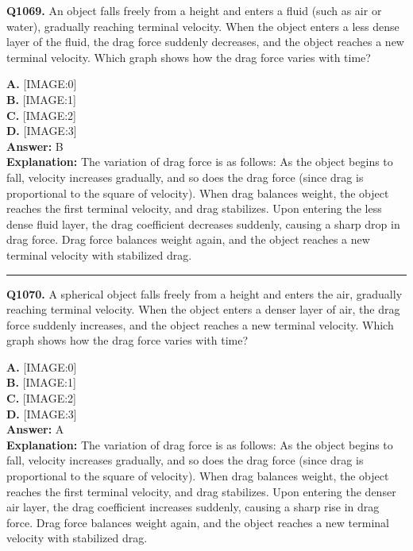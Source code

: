 \documentclass[12pt]{article}
\begin{document}
\noindent
\textbf{Q1069.} An object falls freely from a height and enters a fluid (such as air or water), gradually reaching terminal velocity. When the object enters a less dense layer of the fluid, the drag force suddenly decreases, and the object reaches a new terminal velocity. Which graph shows how the drag force varies with time?



\textbf{A.} [IMAGE:0] \\
\textbf{B.} [IMAGE:1] \\
\textbf{C.} [IMAGE:2] \\
\textbf{D.} [IMAGE:3] \\

\textbf{Answer:} B \\
\textbf{Explanation:} The variation of drag force is as follows:
As the object begins to fall, velocity increases gradually, and so does the drag force (since drag is proportional to the square of velocity).
When drag balances weight, the object reaches the first terminal velocity, and drag stabilizes.
Upon entering the less dense fluid layer, the drag coefficient decreases suddenly, causing a sharp drop in drag force.
Drag force balances weight again, and the object reaches a new terminal velocity with stabilized drag.

\hrule
\vspace{1em}


\noindent
\textbf{Q1070.} A spherical object falls freely from a height and enters the air, gradually reaching terminal velocity. When the object enters a denser layer of air, the drag force suddenly increases, and the object reaches a new terminal velocity. Which graph shows how the drag force varies with time?



\textbf{A.} [IMAGE:0] \\
\textbf{B.} [IMAGE:1] \\
\textbf{C.} [IMAGE:2] \\
\textbf{D.} [IMAGE:3] \\

\textbf{Answer:} A \\
\textbf{Explanation:} The variation of drag force is as follows:
As the object begins to fall, velocity increases gradually, and so does the drag force (since drag is proportional to the square of velocity).
When drag balances weight, the object reaches the first terminal velocity, and drag stabilizes.
Upon entering the denser air layer, the drag coefficient increases suddenly, causing a sharp rise in drag force.
Drag force balances weight again, and the object reaches a new terminal velocity with stabilized drag.
\end{document}

